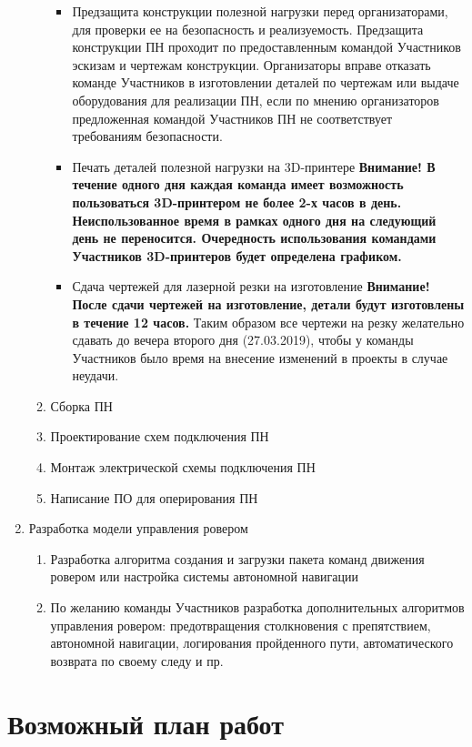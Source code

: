 \begin{enumerate}
\begin{enumerate}
\begin{itemize}
            \item Предзащита конструкции полезной нагрузки перед организаторами, для проверки ее на безопасность и реализуемость. Предзащита конструкции ПН проходит по предоставленным командой Участников эскизам и чертежам конструкции. Организаторы вправе отказать команде Участников в изготовлении деталей по чертежам или выдаче оборудования для реализации ПН, если по мнению организаторов предложенная командой Участников ПН не соответствует требованиям безопасности. 
            \item Печать деталей полезной нагрузки на 3D-принтере
            \textbf{Внимание! В течение одного дня каждая команда имеет возможность пользоваться 3D-принтером не более 2-х часов в день. Неиспользованное время в рамках одного дня на следующий день не переносится. Очередность использования командами Участников 3D-принтеров будет определена графиком.}
            \item Сдача чертежей для лазерной резки на изготовление
            \textbf{Внимание! После сдачи чертежей на изготовление, детали будут изготовлены в течение 12 часов.} Таким образом все чертежи на резку желательно сдавать до вечера второго дня (27.03.2019), чтобы у команды Участников было время на внесение изменений в проекты в случае неудачи.
        \end{itemize}
        \item Сборка ПН
        \item Проектирование схем подключения ПН
        \item Монтаж электрической схемы подключения ПН
        \item Написание ПО для оперирования ПН
    \end{enumerate}
    \item Разработка модели управления ровером
    \begin{enumerate}
	    \item Разработка алгоритма создания и загрузки пакета команд движения ровером или настройка системы автономной навигации
	    \item По желанию команды Участников разработка дополнительных алгоритмов управления ровером: предотвращения столкновения с препятствием, автономной навигации, логирования пройденного пути, автоматического возврата по своему следу и пр. 
    \end{enumerate}
\end{enumerate}

\section{Возможный план работ}

